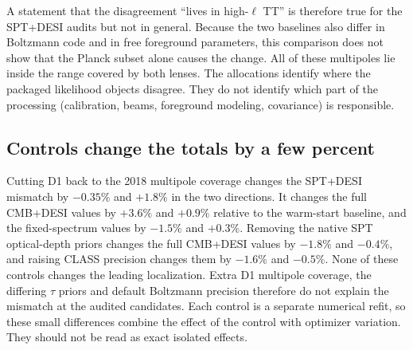 A statement that the disagreement ``lives in high-$\ell$ TT'' is therefore true for the SPT+DESI audits but not in general. Because the two baselines also differ in Boltzmann code and in free foreground parameters, this comparison does not show that the Planck subset alone causes the change. All of these multipoles lie inside the range covered by both lenses. The allocations identify where the packaged likelihood objects disagree. They do not identify which part of the processing (calibration, beams, foreground modeling, covariance) is responsible.

\subsection{Controls change the totals by a few percent}
Cutting D1 back to the 2018 multipole coverage changes the SPT+DESI mismatch by $-0.35\%$ and $+1.8\%$ in the two directions. It changes the full CMB+DESI values by $+3.6\%$ and $+0.9\%$ relative to the warm-start baseline, and the fixed-spectrum values by $-1.5\%$ and $+0.3\%$. Removing the native SPT optical-depth priors changes the full CMB+DESI values by $-1.8\%$ and $-0.4\%$, and raising CLASS precision changes them by $-1.6\%$ and $-0.5\%$. None of these controls changes the leading localization. Extra D1 multipole coverage, the differing $\tau$ priors and default Boltzmann precision therefore do not explain the mismatch at the audited candidates. Each control is a separate numerical refit, so these small differences combine the effect of the control with optimizer variation. They should not be read as exact isolated effects.
